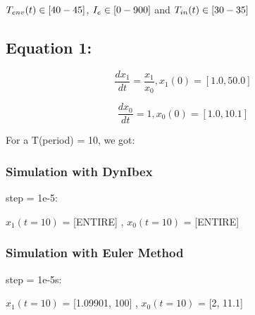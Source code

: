 \documentclass[12pt]{article}
\begin{document}
$ T_{env}(t) \in [40-45] $, $I_{e} \in [0-900] $ and $ T_{in}(t) \in [30-35]$






\subsection{Equation 1:}


\begin{equation}
    \frac{dx_{1}}{dt} = \frac{x_{1}}{x_{0}},   x_{1}(0) = [1.0,50.0]
\end{equation}


\begin{equation}
    \frac{dx_{0}}{dt} = 1, x_{0}(0) = [1.0,10.1]
\end{equation}

For a T(period) = 10, we got: 

\subsubsection{Simulation with DynIbex}

step = 1e-5:


$x_{1}(t=10)$ = [ENTIRE] , 
$x_{0}(t=10)$ = [ENTIRE] 

\subsubsection{Simulation with Euler Method} 

step = 1e-5s:


$x_{1}(t=10)$ = [1.09901, 100] , 
$x_{0}(t=10)$ = [2, 11.1] 
\end{document}
